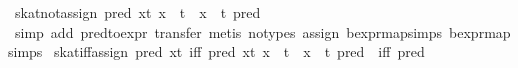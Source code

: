 \begin{isabellebody}
\ skat{}not{}assign{}\ {}{}{}pred\ {}{}{}x{}t{}{}{}{}\ x\ {}{}\ t\ {}\ x\ {}{}\ t{}\ {}{}pred\ {}{}{}\isanewline
%
\isadelimproof
\ \ %
\endisadelimproof
%
\isatagproof
{}\isamarkupfalse%
\ {}simp\ add{}\ pred{}to{}expr{}\ transfer{}\ metis\ {}no{}types{}\ assign{}\ bexpr{}map{}simps{}{}{}\ bexpr{}map{}simps{}{}{}{}%
\endisatagproof
{\isafoldproof}%
%
\isadelimproof
\isanewline
%
\endisadelimproof
\isanewline
{}\isamarkupfalse%
\ skat{}iff{}assign{}\ {}pred\ {}{}{}x{}t{}{}\ iff\ pred\ {}{}{}x{}t{}{}{}\ x\ {}{}\ t\ {}\ x\ {}{}\ t{}\ pred\ {}\ iff\ pred\ {}{}\isanewline

\end{isabellebody}
